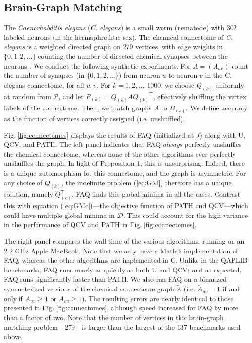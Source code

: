 \documentclass[10pt]{article}
\providecommand{\mc}[1]{\mathcal{#1}}
\providecommand{\mc}[1]{\mathcal{#1}}
\newcommand{\T}{^{\ensuremath{\mathsf{T}}}}
\begin{document}
\subsection{Brain-Graph Matching} 
\label{sub:connectome}




The \emph{Caenorhabditis elegans} (\emph{C. elegans}) is a small worm (nematode) with $302$ labeled neurons (in the hermaphroditic sex).  The chemical connectome of \emph{C. elegans} is a weighted directed graph on 279 vertices, with edge weights in $\{0,1,2,\ldots\}$ counting the number of directed chemical synapses between the neurons \cite{WhiteBrenner86, Varshney2011}.    
We conduct the following synthetic experiments.  
For $A=(A_{uv})$ count the number of synapses (in $\{0,1,2,\ldots\}$) from neuron $u$ to neuron $v$ in the C. elegans connectome, for all $u,v$.  For $k =1,2,\ldots, 1000$, we choose $Q_{(k)}$ uniformly at random from $\mc{P}$, and let $B_{(k)}=Q_{(k)} A {Q_{(k)}}\T$, effectively shuffling the vertex labels of the connectome.  Then, we match graphs $A$ to $B_{(k)}$.  We define accuracy as the fraction of vertices correctly assigned (i.e. unshuffled).



Fig. \ref{fig:connectomes} displays the results of FAQ (initialized at $J$) along with U, QCV,  and PATH.  The left panel indicates that FAQ \emph{always} perfectly unshuffles the chemical connectome, whereas none of the other algorithms ever perfectly unshuffles the graph.  
In light of Proposition 1, this is unsurprising.  Indeed, there is a unique automorphism for this connectome, and the graph is asymmetric.  For any choice of $Q_{(k)}$, the indefinite problem (\ref{eq:GM}) therefore has a unique solution, namely $Q_{(k)}\T$.  FAQ finds this global minima in all the cases.  Contrast this with equation (\ref{eq:GMc})---the objective function of PATH and QCV---which could have multiple global minima in $\mc{D}$.  This could account for the high variance in the performance of QCV and PATH in Fig. \ref{fig:connectomes}. 
 
The right panel compares the wall time of the various algorithms, running on an 2.2 GHz Apple MacBook. Note that we only have a Matlab implementation of FAQ, whereas the other algorithms are implemented in C.  
Unlike in the QAPLIB benchmarks, FAQ runs nearly as quickly as both U and QCV; and as expected, FAQ runs significantly faster than PATH.  
We also ran FAQ on a binarized symmeterized versions of the chemical connectome graph $\tilde A$ (i.e. $\tilde A_{uv}=1$ if and only if $A_{uv}\geq 1$ or $A_{vu} \geq 1$).  The resulting errors are nearly identical to those presented in Fig. \ref{fig:connectomes}, although speed increased for FAQ by more than a factor of two. Note that the number of vertices in this brain-graph matching problem---279---is larger than the largest of the 137 benchmarks used above. 
\end{document}
